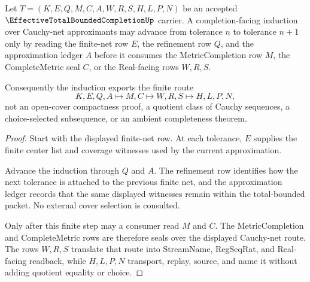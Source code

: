 \begin{theorem}
\label{thm:effective-total-bounded-completion-cauchy-net-induction}
Let $T=(K,E,Q,M,C,A,W,R,S,H,L,P,N)$ be an accepted $\EffectiveTotalBoundedCompletionUp$ carrier. A completion-facing induction over Cauchy-net approximants may advance from tolerance $n$ to tolerance $n+1$ only by reading the finite-net row $E$, the refinement row $Q$, and the approximation ledger $A$ before it consumes the MetricCompletion row $M$, the CompleteMetric seal $C$, or the Real-facing rows $W,R,S$.

Consequently the induction exports the finite route
$$
K,E,Q,A \longmapsto M,C \longmapsto W,R,S \longmapsto H,L,P,N,
$$
not an open-cover compactness proof, a quotient class of Cauchy sequences, a choice-selected subsequence, or an ambient completeness theorem.
\end{theorem}
\begin{proof}
Start with the displayed finite-net row. At each tolerance, $E$ supplies the finite center list and coverage witnesses used by the current approximation.

Advance the induction through $Q$ and $A$. The refinement row identifies how the next tolerance is attached to the previous finite net, and the approximation ledger records that the same displayed witnesses remain within the total-bounded packet. No external cover selection is consulted.

Only after this finite step may a consumer read $M$ and $C$. The MetricCompletion and CompleteMetric rows are therefore seals over the displayed Cauchy-net route. The rows $W,R,S$ translate that route into StreamName, RegSeqRat, and Real-facing readback, while $H,L,P,N$ transport, replay, source, and name it without adding quotient equality or choice.
\end{proof}




